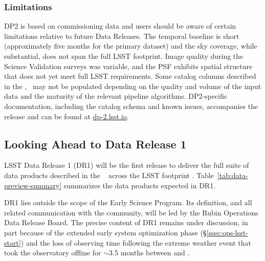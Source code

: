 \subsubsection{Limitations}

DP2 is based on commissioning data and users should be aware of certain limitations relative to future Data Releases.
The temporal baseline is short (approximately five months for the primary dataset) and the sky coverage, while substantial, does not span the full LSST footprint.
Image quality during the Science Validation surveys was variable, and the PSF exhibits spatial structure that does not yet meet full LSST requirements.
Some catalog columns described in the \dpdd{},~ may not be populated depending on the quality and volume of the input data and the maturity of the relevant pipeline algorithms.
DP2-specific documentation, including the catalog schema and known issues, accompanies the release and can be found at \url{dp-2.lsst.io}.

\subsection{Looking Ahead to Data Release 1}
\label{ssec:dr1}
%
LSST Data Release 1 (DR1) will be the first release to deliver the full suite of data products described in the \dpdd{}~ across the LSST footprint \citep{PSTN-056}.
Table~\ref{tab:data-preview-summary} summarizes the data products expected in DR1.

DR1 lies outside the scope of the Early Science Program.
Its definition, and all related communication with the community, will be led by the Rubin Operations Data Release Board.
The precise content of DR1 remains under discussion, in part because of the extended early system optimization phase (\S\ref{ssec:ops-lsst-start}) and the loss of observing time following the extreme weather event that took the observatory offline for $\sim$3.5 months between \elninooffsky and \elninoonsky.





